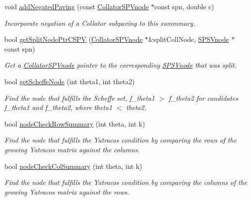 \begin{DoxyCompactItemize}
void \hyperlink{classsubpavings_1_1CollatorSPVnode_a2976605178012f7d9b23bca1d7f9beb4}{add\-Negated\-Paving} (const \hyperlink{classsubpavings_1_1CollatorSPVnode}{\-Collator\-S\-P\-Vnode} $\ast$const spn, double c)
\begin{DoxyCompactList}\small\item\em \-Incorporate negation of a \-Collator subpaving to this summmary. \end{DoxyCompactList}\item 
bool \hyperlink{classsubpavings_1_1CollatorSPVnode_ae3670805f36e313e7e541d57552d6b34}{get\-Split\-Node\-Ptr\-C\-S\-P\-V} (\hyperlink{classsubpavings_1_1CollatorSPVnode}{\-Collator\-S\-P\-Vnode} $\ast$\&split\-Coll\-Node, \hyperlink{classsubpavings_1_1SPSVnode}{\-S\-P\-S\-Vnode} $\ast$const spn)
\begin{DoxyCompactList}\small\item\em \-Get a \hyperlink{classsubpavings_1_1CollatorSPVnode}{\-Collator\-S\-P\-Vnode} pointer to the corresponding \hyperlink{classsubpavings_1_1SPSVnode}{\-S\-P\-S\-Vnode} that was split. \end{DoxyCompactList}\item 
bool \hyperlink{classsubpavings_1_1CollatorSPVnode_ab134b9b98ed7b15b1cabb9eca1ced1eb}{get\-Scheffe\-Node} (int theta1, int theta2)
\begin{DoxyCompactList}\small\item\em \-Find the node that fulfills the \-Scheffe set, f\-\_\-theta1 $>$ f\-\_\-theta2 for candidates f\-\_\-theta1 and f\-\_\-theta2, where theta1 $<$ theta2. \end{DoxyCompactList}\item 
bool \hyperlink{classsubpavings_1_1CollatorSPVnode_a199762d07823cde9934100fb6d11228c}{node\-Check\-Row\-Summary} (int theta, int k)
\begin{DoxyCompactList}\small\item\em \-Find the node that fulfills the \-Yatracos condition by comparing the rows of the growing \-Yatracos matrix against the columns. \end{DoxyCompactList}\item 
bool \hyperlink{classsubpavings_1_1CollatorSPVnode_a61360380c921f78c1ac9689ffe004c60}{node\-Check\-Col\-Summary} (int theta, int k)
\begin{DoxyCompactList}\small\item\em \-Find the node that fulfills the \-Yatracos condition by comparing the columns of the growing \-Yatracos matrix against the rows. \end{DoxyCompactList}\item 

\end{DoxyCompactItemize}
